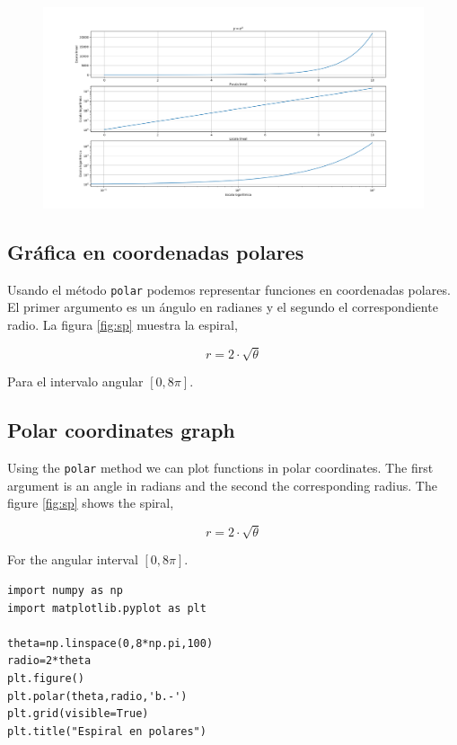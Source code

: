 \begin{figure}[h]
    \centering
    \includegraphics[width=1\linewidth]{figuras/plt_log_scales.png}
    \label{fig:scale}
\end{figure}
\begin{paracol}{2}
\subsection{Gráfica en coordenadas polares}
Usando el método \texttt{polar} podemos representar funciones en coordenadas polares. El primer argumento  es un ángulo en radianes y el segundo el correspondiente radio. La figura \ref{fig:sp} muestra la espiral,

\begin{equation*}
r=2\cdot\sqrt{\theta}
\end{equation*}

Para el intervalo angular $[0,8\pi]$.

 \switchcolumn

\subsection{Polar coordinates graph}
Using the \texttt{polar} method we can plot functions in polar coordinates. The first argument is an angle in radians and the second the corresponding radius. The figure \ref{fig:sp} shows the spiral,

\begin{equation}
r=2\cdot\sqrt{\theta}
\end{equation}

For the angular interval $[0,8\pi]$.
\end{paracol}
\begin{verbatim}
import numpy as np
import matplotlib.pyplot as plt

theta=np.linspace(0,8*np.pi,100)
radio=2*theta
plt.figure()
plt.polar(theta,radio,'b.-')
plt.grid(visible=True)
plt.title("Espiral en polares")
\end{verbatim}

